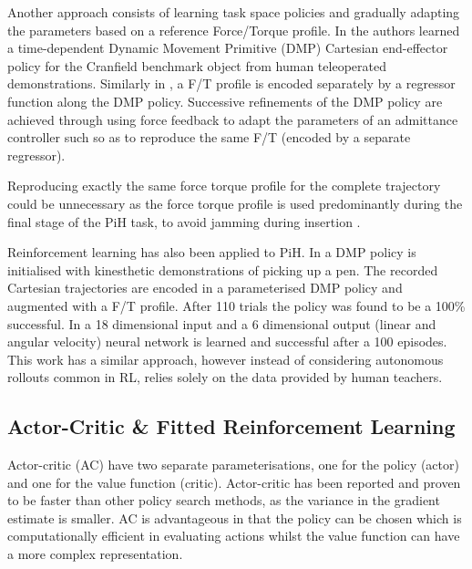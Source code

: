 \documentclass[final,5p,times,twocolumn]{elsarticle}
\begin{document}
Another approach consists of learning task space policies and gradually adapting the parameters based on a reference
Force/Torque profile. In \cite{fast_peg_pbd_icmc_2014} the authors learned a time-dependent Dynamic Movement 
Primitive (DMP) \cite{Schaal04learningmovement} Cartesian end-effector policy for the Cranfield benchmark 
object from human teleoperated demonstrations. Similarly in \cite{trans_workpiece_icra_2013,sol_pdg_pbd_2014}, 
a F/T profile is encoded separately by a regressor function along the DMP policy. Successive refinements of 
the DMP policy are achieved through using force feedback to adapt the parameters of an admittance controller such 
so as to reproduce the same F/T (encoded by a separate regressor).

Reproducing exactly the same force torque profile for the complete trajectory could be 
unnecessary as the force torque profile is used predominantly during the final stage of the PiH task, 
to avoid jamming during insertion \cite[Chap. 5]{Kronander2015}. 

Reinforcement learning has also been applied to PiH. In \cite{learn_force_c_icirs_2011} a DMP policy is 
initialised with kinesthetic demonstrations of picking up a pen. The recorded Cartesian 
trajectories are encoded in a parameterised DMP policy and augmented with a F/T profile. 
After 110 trials the policy was found to be a 100\% successful. In \cite{learn_admittance_icra_1994} a 18 dimensional input 
and a 6 dimensional output (linear and angular velocity) neural network is learned and successful after a 100 episodes. 
This work has a similar approach, however instead of considering autonomous rollouts common in RL, 
relies solely on the data provided by human teachers.

\subsection{Actor-Critic \& Fitted Reinforcement Learning}

Actor-critic (AC) \cite[Chap. 6.6]{sutton1998reinforcement} have two separate parameterisations, one for the policy (actor) and
one for the value function (critic). Actor-critic has been reported and proven \cite{rl_ac_surv_2012} to be faster than other policy 
search methods, as the variance in the gradient estimate is smaller. AC is advantageous in that the policy can be chosen which 
is computationally efficient in evaluating actions whilst the value function can have a more complex representation.
\end{document}
